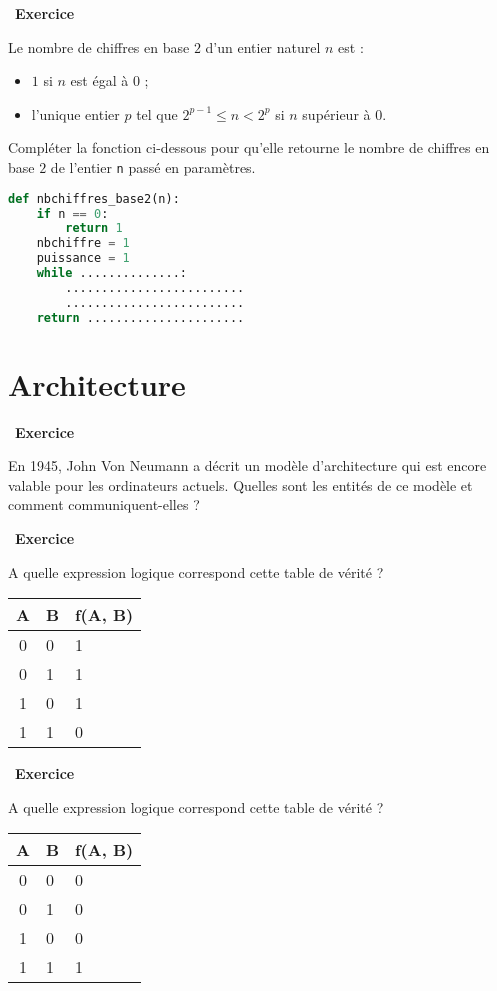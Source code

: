\documentclass[
  11pt,
]{article}
\providecommand{\tightlist}{%
  \setlength{\itemsep}{0pt}\setlength{\parskip}{0pt}}
\newcounter{exo}
\newenvironment{exercice}[1]
{\par \medskip   \addtocounter{exo}{1} \noindent  
\begin{bclogo}[arrondi =0.1,   noborder = true, logo=\bccrayon, marge=4]{~\textbf{Exercice} \textbf{\theexo} {\itshape #1} }  \par}
{
\end{bclogo}
 \par \bigskip }
\newcounter{def}
\newcounter{logi}
\begin{document}
\begin{exercice}{}

Le nombre de chiffres en base \(2\) d'un entier naturel \(n\) est :

\begin{itemize}
\tightlist
\item
  \(1\) si \(n\) est égal à \(0\) ;
\item
  l'unique entier \(p\) tel que \(2^{p-1} \leqslant n < 2^{p}\) si \(n\)
  supérieur à \(0\).
\end{itemize}

Compléter la fonction ci-dessous pour qu'elle retourne le nombre de
chiffres en base \(2\) de l'entier \texttt{n} passé en paramètres.

\begin{lstlisting}[language=Python]
def nbchiffres_base2(n):
    if n == 0:
        return 1
    nbchiffre = 1
    puissance = 1
    while ..............:
        .........................
        .........................
    return ......................
\end{lstlisting}

\end{exercice}

\hypertarget{architecture}{%
\section{Architecture}\label{architecture}}

\begin{exercice}{}

En 1945, John Von Neumann a décrit un modèle d'architecture qui est
encore valable pour les ordinateurs actuels. Quelles sont les entités de
ce modèle et comment communiquent-elles ?

\end{exercice}

\begin{exercice}{}

A quelle expression logique correspond cette table de vérité ?

\begin{longtable}[]{@{}cll@{}}
\toprule
A & B & f(A, B)\tabularnewline
\midrule
\endhead
0 & 0 & 1\tabularnewline
0 & 1 & 1\tabularnewline
1 & 0 & 1\tabularnewline
1 & 1 & 0\tabularnewline
\bottomrule
\end{longtable}

\end{exercice}

\begin{exercice}{}

A quelle expression logique correspond cette table de vérité ?

\begin{longtable}[]{@{}cll@{}}
\toprule
A & B & f(A, B)\tabularnewline
\midrule
\endhead
0 & 0 & 0\tabularnewline
0 & 1 & 0\tabularnewline
1 & 0 & 0\tabularnewline
1 & 1 & 1\tabularnewline
\bottomrule
\end{longtable}

\end{exercice}
\end{document}
